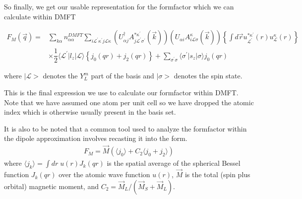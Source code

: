 \documentclass[10pt]{ruthesis}
\begin{document}
{So finally, we get our usable representation for the formfactor which we can calculate within DMFT

\begin{equation} \label{eq 19}
\begin{split}
F_{M}(\vec{q})= & \sum_{k\alpha} n^{DMFT}_{\alpha \alpha} \sum_{i \mathcal{L}^{'} \kappa^{'} j \mathcal{L}\kappa}\left( U^{\dagger}_{\alpha j} A^{* \kappa^{'}}_{j \mathcal{L}^{'} \sigma^{'}}(\vec{k})\right)\left( U_{\alpha i} A^{ \kappa}_{i \mathcal{L}\sigma}(\vec{k})\right) \left\lbrace \int d \vec{r}u_{\mathcal{L^{'}}}^{*\kappa^{'}}(r)u_{\mathcal{L}}^{\kappa}(r) \right\rbrace\\
& \times \dfrac{1}{2} \langle\mathcal{L^{'}}|l_{z}|\mathcal{L}\rangle \left\lbrace  j_{0}(qr) +j_{2}(qr) \right \rbrace + \sum_{\sigma^{'} \sigma} \langle \sigma^{'} |s_{z}|\sigma \rangle 
 j_0(qr)
\end{split}
\end{equation}

where $|\mathcal{L}>$ denotes the $Y_{L}^{m}$ part of the basis and $|\sigma>$ denotes the spin state.

This is the final expression we use to calculate our formfactor within DMFT. Note that we have assumed one atom per unit cell so we have dropped the atomic index which is otherwise usually present in the basis set.

It is also to be noted that a common tool used to analyze the formfactor within the dipole approximation involves recasting it into the  form.
\begin{align}
F_{M}=\vec{M} \left( \langle j_{0} \rangle + C_{2} \langle j_{0}+j_{2} \rangle \right) 
\end{align} 
where $\langle j_k \rangle = \int dr\; u(r)
J_k(qr)$ is the spatial average of the spherical Bessel function
$J_k(qr)$ over the atomic wave function $u(r)$,
$\vec{M}$ is the total (spin plus orbital) magnetic moment,
and $C_2 = \vec{M}_L/(\vec{M}_S + \vec{M}_L)$.

}
\end{document}

